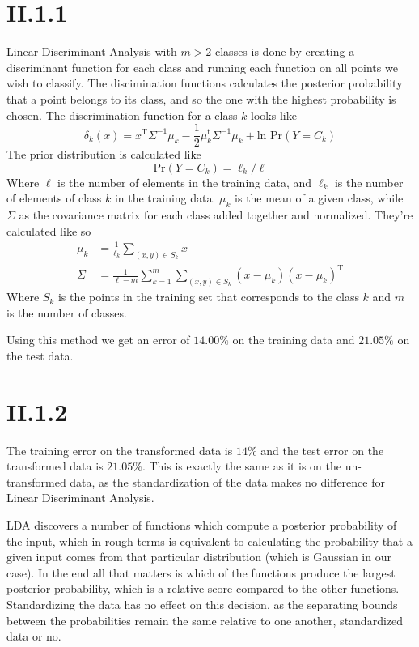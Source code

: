 \section*{II.1.1}
Linear Discriminant Analysis with $m>2$ classes is done by creating a
discriminant function for each class and running each function on all points we
wish to classify. The discimination functions calculates the posterior
probability that a point belongs to its class, and so the one with the highest
probability is chosen.
The discrimination function for a class $k$ looks like
\[
  \delta_k(x) = x^\text{T}\Sigma^{-1}\mu_k - 
  \frac{1}{2}\mu^{\text{t}}_k\Sigma^{-1}\mu_k + \text{ln Pr}(Y = C_k)
\]
The prior distribution is calculated like
\[
  \text{Pr}(Y = C_k) = \ell_k / \ell
\]
Where $\ell$ is the number of elements in the training data, and $\ell_k$ is the
number of elements of class $k$ in the training data. $\mu_k$ is the mean of a
given class, while $\Sigma$ as the covariance matrix for each class added
together and normalized. They're calculated like so
\begin{align*}
  \mu_k  &= \frac{1}{\ell_k}\sum_{(x,y) \in S_k}x \\
  \Sigma &= \frac{1}{\ell - m}\sum_{k=1}^{m}\sum_{(x,y) \in S_k}(x-\mu_k)(x-\mu_k)^{\text{T}}
\end{align*}
Where $S_k$ is the points in the training set that corresponds to the class $k$
and $m$ is the number of classes.

Using this method we get an error of $14.00\%$ on the training data and
$21.05\%$ on the test data.

\section*{II.1.2}
The training error on the transformed data is $14\%$ and the test error on
the transformed data is $21.05\%$. This is exactly the same as it is on
the un-transformed data, as the standardization of the data makes no
difference for Linear Discriminant Analysis.

LDA discovers a number of functions which compute a posterior probability of the input,
which in rough terms is equivalent to calculating the probability that a given input comes
from that particular distribution (which is Gaussian in our case). In the end all that matters is
which of the functions produce the largest posterior probability, which is a
relative score compared to the other functions. Standardizing the data has no effect on this decision,
as the separating bounds between the probabilities remain the same relative to one another,
standardized data or no.

